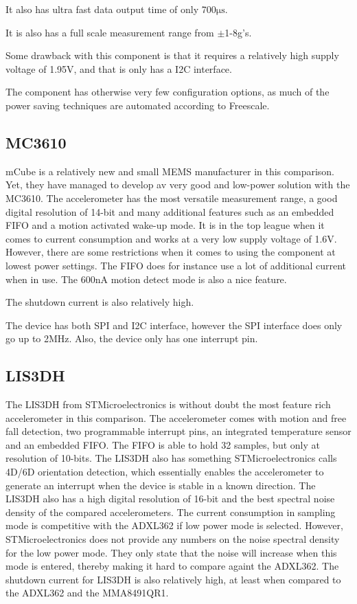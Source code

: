 It also has ultra fast data output time of only 700$\si{\micro\second}$.

It is also has a full scale measurement range from $\pm$1-8g's.

Some drawback with this component is that it requires a relatively high supply voltage of 1.95V, and that is only has a I2C interface.

The component has otherwise very few configuration options, as much of the power saving techniques are automated according to Freescale.

\subsection{MC3610}
mCube is a relatively new and small MEMS manufacturer in this comparison. Yet, they have managed to develop av very good and low-power solution with the MC3610. The accelerometer has the most versatile measurement range, a good digital resolution of 14-bit and many additional features such as an embedded FIFO and a motion activated wake-up mode. It is in the top league when it comes to current consumption and works at a very low supply voltage of 1.6V. However, there are some restrictions when it comes to using the component at lowest power settings. The FIFO does for instance use a lot of additional current when in use. The 600nA motion detect mode is also a nice feature.

The shutdown current is also relatively high.

The device has both SPI and I2C interface, however the SPI interface does only go up to 2MHz. Also, the device only has one interrupt pin.

\subsection{LIS3DH}

The LIS3DH from STMicroelectronics is without doubt the most feature rich accelerometer in this comparison. The accelerometer comes with motion and free fall detection, two programmable interrupt pins, an integrated temperature sensor and an embedded FIFO. The FIFO is able to hold 32 samples, but only at resolution of 10-bits. The LIS3DH also has something STMicroelectronics calls 4D/6D orientation detection, which essentially enables the accelerometer to generate an interrupt when the device is stable in a known direction. The LIS3DH also has a high digital resolution of 16-bit and the best spectral noise density of the compared accelerometers. The current consumption in sampling mode is competitive with the ADXL362 if low power mode is selected. However, STMicroelectronics does not provide any numbers on the noise spectral density for the low power mode. They only state that the noise will increase when this mode is entered, thereby making it hard to compare againt the ADXL362. The shutdown current for LIS3DH is also relatively high, at least when compared to the ADXL362 and the MMA8491QR1. 


